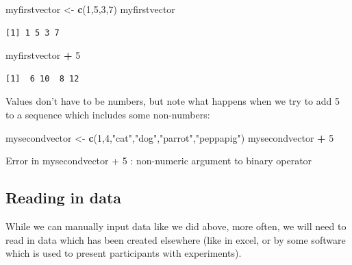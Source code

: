 \documentclass[]{book}
\newenvironment{Shaded}{\begin{snugshade}}{\end{snugshade}}
\newcommand{\DecValTok}[1]{\textcolor[rgb]{0.00,0.00,0.81}{#1}}
\newcommand{\KeywordTok}[1]{\textcolor[rgb]{0.13,0.29,0.53}{\textbf{#1}}}
\newcommand{\NormalTok}[1]{#1}
\newcommand{\OperatorTok}[1]{\textcolor[rgb]{0.81,0.36,0.00}{\textbf{#1}}}
\newcommand{\StringTok}[1]{\textcolor[rgb]{0.31,0.60,0.02}{#1}}
\begin{document}
\begin{Shaded}
\begin{Highlighting}[]
\NormalTok{myfirstvector <-}\StringTok{ }\KeywordTok{c}\NormalTok{(}\DecValTok{1}\NormalTok{,}\DecValTok{5}\NormalTok{,}\DecValTok{3}\NormalTok{,}\DecValTok{7}\NormalTok{)}
\NormalTok{myfirstvector}
\end{Highlighting}
\end{Shaded}

\begin{verbatim}
[1] 1 5 3 7
\end{verbatim}

\begin{Shaded}
\begin{Highlighting}[]
\NormalTok{myfirstvector }\OperatorTok{+}\StringTok{ }\DecValTok{5}
\end{Highlighting}
\end{Shaded}

\begin{verbatim}
[1]  6 10  8 12
\end{verbatim}

Values don't have to be numbers, but note what happens when we try to add 5 to a sequence which includes some non-numbers:

\begin{Shaded}
\begin{Highlighting}[]
\NormalTok{mysecondvector <-}\StringTok{ }\KeywordTok{c}\NormalTok{(}\DecValTok{1}\NormalTok{,}\DecValTok{4}\NormalTok{,}\StringTok{"cat"}\NormalTok{,}\StringTok{"dog"}\NormalTok{,}\StringTok{"parrot"}\NormalTok{,}\StringTok{"peppapig"}\NormalTok{)}
\NormalTok{mysecondvector }\OperatorTok{+}\StringTok{ }\DecValTok{5}
\end{Highlighting}
\end{Shaded}

Error in mysecondvector + 5 : non-numeric argument to binary operator

\hypertarget{reading-in-data}{%
\subsection*{Reading in data}\label{reading-in-data}}

While we can manually input data like we did above, more often, we will need to read in data which has been created elsewhere (like in excel, or by some software which is used to present participants with experiments).
\end{document}
